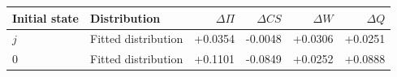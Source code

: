 \begin{tabular}{llrrrr}\toprule
Initial state & Distribution & $\Delta\Pi$ & $\Delta CS$ & $\Delta W$ & $\Delta Q$\\\midrule
$j$ & Fitted distribution & +0.0354 & -0.0048 & +0.0306 & +0.0251 \\
$0$ & Fitted distribution & +0.1101 & -0.0849 & +0.0252 & +0.0888 \\
\bottomrule\end{tabular}
